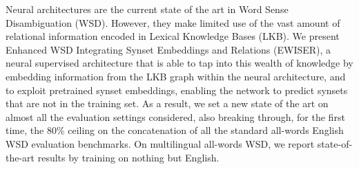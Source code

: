 Neural architectures are the current state of the art in Word Sense Disambiguation (WSD). However, they make limited use of the vast amount of relational information encoded in Lexical Knowledge Bases (LKB). We present Enhanced WSD Integrating Synset Embeddings and Relations (EWISER), a neural supervised architecture that is able to tap into this wealth of knowledge by embedding information from the LKB graph within the neural architecture, and to exploit pretrained synset embeddings, enabling the network to predict synsets that are not in the training set. As a result, we set a new state of the art on almost all the evaluation settings considered, also breaking through, for the first time, the 80\% ceiling on the concatenation of all the standard all-words English WSD evaluation benchmarks. On multilingual all-words WSD, we report state-of-the-art results by training on nothing but English.
